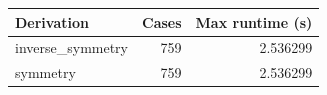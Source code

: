 {\small
\begin{tabular}{lrr}
\hline
Derivation & Cases & Max runtime (s) \\
\hline
inverse\_symmetry & 759 & 2.536299 \\
symmetry & 759 & 2.536299 \\
\hline
\end{tabular}
}
